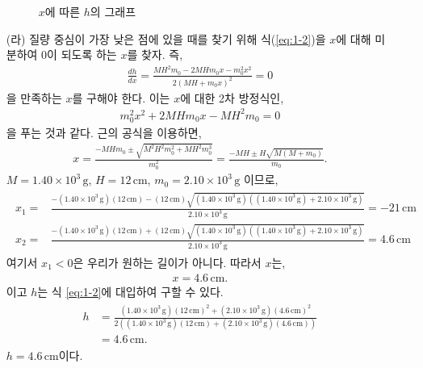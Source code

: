 \documentclass[floatfix,nofootinbib,superscriptaddress,fleqn]{revtex4-2}
\begin{document}
\begin{itemize}
\begin{figure}[htbp]
    \caption{$x$에 따른 $h$의 그래프}
    \label{<label>}
  \end{figure}
  \item[(라)] 질량 중심이 가장 낮은 점에 있을 때를 찾기 위해 식(\ref{eq:1-2})을 
  $x$에 대해 미분하여 0이 되도록 하는 $x$를 찾자. 즉,
  \begin{align}
    \frac{dh}{dx} = \frac{MH^2m_0-2MHm_0x-m_0^2x^2}{2(MH+m_0x)^2} = 0
  \end{align}
  을 만족하는 $x$를 구해야 한다. 이는 $x$에 대한 2차 방정식인,
  \begin{align}
    m_0^2x^2 +2MHm_0x -MH^2m_0 = 0 
  \end{align}
  을 푸는 것과 같다. 근의 공식을 이용하면,
  \begin{align}
    x = \frac{-MHm_0\pm\sqrt{M^2H^2m_0^2+MH^2m_0^3}}{m_0^2}
    = \frac{-MH\pm H\sqrt{M(M+m_0)}}{m_0}.
  \end{align}
  $M=1.40\times 10^{3}\,\mathrm{g}$, $H=12\,\mathrm{cm}$,
  $m_0=2.10\times 10^3\,\mathrm{g}$ 이므로,
  \begin{align}
    \begin{split}
      x_1 =& \frac{-(1.40\times 10^{3}\,\mathrm{g})(12\,\mathrm{cm}) 
      - (12\,\mathrm{cm})\sqrt{(1.40\times 10^{3}\,\mathrm{g})
      ((1.40\times 10^{3}\,\mathrm{g})
      +2.10\times 10^3\,\mathrm{g})}}{2.10\times 10^3\,\mathrm{g}}
      =-21\,\mathrm{cm}  \\
      x_2 =& \frac{-(1.40\times 10^{3}\,\mathrm{g})(12\,\mathrm{cm}) 
      + (12\,\mathrm{cm})\sqrt{(1.40\times 10^{3}\,\mathrm{g})
      ((1.40\times 10^{3}\,\mathrm{g})
      +2.10\times 10^3\,\mathrm{g})}}{2.10\times 10^3\,\mathrm{g}}
      =4.6\,\mathrm{cm}
    \end{split}
  \end{align}
  여기서 $x_1<0$은 우리가 원하는 길이가 아니다. 따라서 $x$는,
  \begin{align}
    x = 4.6\,\mathrm{cm}.
  \end{align}
  이고 $h$는 식 \eqref{eq:1-2}에 대입하여 구할 수 있다.
  \begin{align}
    \begin{split}
      h &= \frac{(1.40\times 10^{3}\,\mathrm{g})(12\,\mathrm{cm})^2
      +(2.10\times 10^3\,\mathrm{g})(4.6\,\mathrm{cm})^2}
      {2((1.40\times 10^{3}\,\mathrm{g})(12\,\mathrm{cm})
      +(2.10\times 10^3\,\mathrm{g})(4.6\,\mathrm{cm}))}  \\
      &= 4.6\,\mathrm{cm}.
    \end{split}
  \end{align}
  $h = 4.6\,\mathrm{cm}$이다.
\end{itemize}
\end{document}
